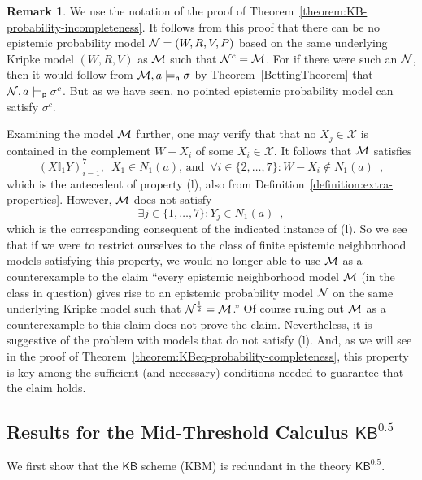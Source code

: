 \documentclass[12pt]{article}
\theoremstyle{definition}
\newtheorem{remark}[theorem]{Remark}
\newcommand{\M}{{\cal M}}      %
\newcommand{\N}{{\cal N}}      %
\newcommand{\KB}{{\mathsf{KB}}}                        %
\newcommand{\KBeq}{{\mathsf{KB}^{\mathsf{0.5}}}}       %
\newcommand{\modelsn}{\models_{\mathsf{n}}}                  %
\newcommand{\modelsp}{\models_{\mathsf{p}}}                  %
\begin{document}
\begin{remark}
  We use the notation of the proof of
  Theorem~\ref{theorem:KB-probability-incompleteness}.  It follows
  from this proof that there can be no epistemic probability model
  $\N=(W,R,V,P)$ based on the same underlying Kripke model $(W,R,V)$
  as $\M$ such that $\N^c=\M$.  For if there were such an $\N$, then
  it would follow from $\M,a\modelsn\sigma$ by
  Theorem~\ref{BettingTheorem} that $\N,a\modelsp\sigma^c$.  But as we
  have seen, no pointed epistemic probability model can satisfy
  $\sigma^c$.

  Examining the model $\M$ further, one may verify that that no
  $X_j\in\mathcal{X}$ is contained in the complement $W-X_i$ of some
  $X_i\in\mathcal{X}$.  It follows that $\M$ satisfies
  \[
    (X\mathbb{I}_1Y)_{i=1}^7,\enspace
    X_1\in N_1(a)\text{, and}\enspace
    \forall i\in\{2,\dots,7\}:W-X_i\notin N_1(a)\enspace,
  \]
  which is the antecedent of property (l), also from
  Definition~\ref{definition:extra-properties}.  However, $\M$ does
  not satisfy
  \[
  \exists j\in\{1,\dots,7\}:Y_j\in N_1(a)\enspace,
  \]
  which is the corresponding consequent of the indicated instance of
  (l).  So we see that if we were to restrict ourselves to the class
  of finite epistemic neighborhood models satisfying this property, we
  would no longer able to use $\M$ as a counterexample to the claim
  ``every epistemic neighborhood model $\M$ (in the class in question)
  gives rise to an epistemic probability model $\N$ on the same
  underlying Kripke model such that $\N^{\frac 12}=\M$.''  Of course
  ruling out $\M$ as a counterexample to this claim does not prove the
  claim.  Nevertheless, it is suggestive of the problem with models
  that do not satisfy (l).  And, as we will see in the proof of
  Theorem~\ref{theorem:KBeq-probability-completeness}, this property
  is key among the sufficient (and necessary) conditions needed to
  guarantee that the claim holds.
\end{remark}

\subsection{Results for the Mid-Threshold Calculus \texorpdfstring{$\KBeq$}{KB.5}}
\label{section:kbeq}

We first show that the $\KB$ scheme (KBM) is redundant in the theory
$\KBeq$.
\end{document}
